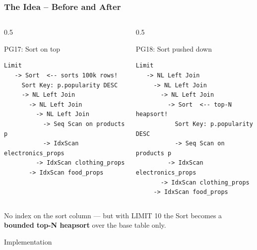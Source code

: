 \documentclass{beamer}
\begin{document}
\begin{frame}[fragile]\frametitle{The Idea -- Before and After}
\begin{columns}[T]\begin{column}{0.5\textwidth}
\begin{block}{PG17: Sort on top}
\begin{lstlisting}[basicstyle=\tiny]
 Limit
   -> Sort  <-- sorts 100k rows!
     Sort Key: p.popularity DESC
     -> NL Left Join
       -> NL Left Join
         -> NL Left Join
           -> Seq Scan on products p
           -> IdxScan electronics_props
         -> IdxScan clothing_props
       -> IdxScan food_props
\end{lstlisting}
\end{block}
\end{column}\begin{column}{0.5\textwidth}
\begin{block}{PG18: Sort pushed down}
\begin{lstlisting}[basicstyle=\tiny]
 Limit
   -> NL Left Join
     -> NL Left Join
       -> NL Left Join
         -> Sort  <-- top-N heapsort!
           Sort Key: p.popularity DESC
           -> Seq Scan on products p
         -> IdxScan electronics_props
       -> IdxScan clothing_props
     -> IdxScan food_props
\end{lstlisting}
\end{block}
\end{column}\end{columns}
\bigskip
\begin{center}
No index on the sort column --- but with LIMIT 10 the Sort becomes
a \textbf{bounded top-N heapsort} over the base table only.
\end{center}
\end{frame}


\begin{frame}
\vspace*{\fill}\begin{center}
\huge{Implementation}
\end{center}\vspace*{\fill}
\end{frame}
\end{document}
